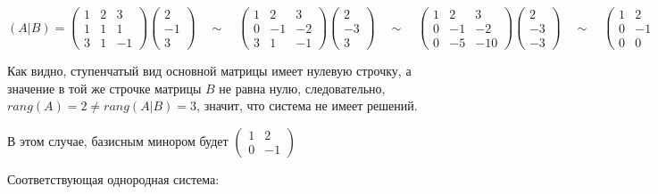 \begin{enumerate}
    $(A|B) = \begin{pmatrix}1 & 2 & 3\\ 1 & 1 & 1 \\ 3 & 1 & -1\end{pmatrix}\begin{pmatrix}2 \\ -1 \\ 3\end{pmatrix}
    \quad\sim\quad
    \begin{pmatrix}1 & 2 & 3\\ 0 & -1 & -2 \\ 3 & 1 & -1\end{pmatrix}\begin{pmatrix}2 \\ -3 \\ 3\end{pmatrix}
    \quad\sim\quad
    \begin{pmatrix}1 & 2 & 3\\ 0 & -1 & -2 \\ 0 & -5 & -10\end{pmatrix}\begin{pmatrix}2 \\ -3 \\ -3\end{pmatrix}
    \quad\sim\quad
    \begin{pmatrix}1 & 2 & 3\\ 0 & -1 & -2 \\ 0 & 0 & 0\end{pmatrix}\begin{pmatrix}2 \\ -3 \\ 12\end{pmatrix}$

    Как видно, ступенчатый вид основной матрицы имеет нулевую строчку, а значение в той же строчке матрицы $B$ не равна нулю,
    следовательно, $rang(A) = 2 \neq rang(A|B) = 3$, значит, что система не имеет решений.

    В этом случае, базисным минором будет $\begin{pmatrix}1 & 2\\ 0 & -1\end{pmatrix}$

    Соответствующая однородная система:


\end{enumerate}
